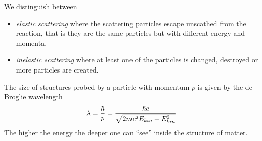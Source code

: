 \documentclass[12pt]{article}
\newcommand{\lambdabar}{{\mkern0.75mu\mathchar '26\mkern -9.75mu\lambda}}
\begin{document}
We distinguish between
\begin{itemize}
\item \emph{elastic scattering} where the scattering particles escape unscathed from the reaction, that is they are the same particles but with different energy and momenta.
\item \emph{inelastic scattering} where at least one of the particles is changed, destroyed or more particles are created.
\end{itemize}

 The size of structures probed by a particle with momentum $p$ is given by the de-Broglie wavelength
 \[\lambdabar=\frac{\hbar}{p}=\frac{\hbar c}{\sqrt{2mc^2 E_{kin}+E_{kin}^2}}\]
The higher the energy the deeper one can ``see'' inside the structure of matter.   

\end{document}
